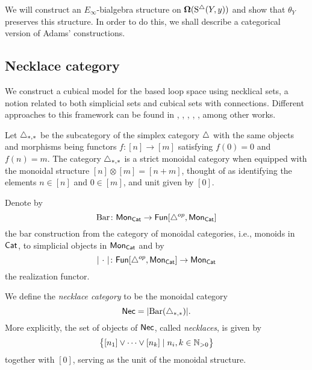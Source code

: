 We will construct an $E_{\infty}$-bialgebra structure on $\operatorname{\mathbf{\Omega}}(\operatorname{S^{\triangle}}(Y, y))$ and show that $\theta_Y$ preserves this structure.
In order to do this, we shall describe a categorical version of Adams' constructions.

\subsection{Necklace category}

We construct a cubical model for the based loop space using necklical sets, a notion related to both simplicial sets and cubical sets with connections.
Different approaches to this framework can be found in \cite{baues1998hopf}, \cite{galvez2020hopf}, \cite{dugger2011rigidification}, \cite{rivera2018cubical}, \cite{rivera2019path}, among other works.

Let $\triangle_{*,*}$ be the subcategory of the simplex category $\triangle$ with the same objects and morphisms being functors $f \colon [n] \to [m]$ satisfying $f(0) = 0$ and $f(n) = m$.
The category $\triangle_{*,*}$ is a strict monoidal category when equipped with the monoidal structure $[n] \otimes [m] = [n+m]$, thought of as identifying the elements $n \in [n]$ and $0 \in [m]$, and unit given by $[0]$.

Denote by
\begin{equation*}
\operatorname{Bar} \colon \mathsf{Mon}_{\mathsf{Cat}} \to \mathsf{Fun}[\triangle^{op}, \mathsf{Mon}_{\mathsf{Cat}}]
\end{equation*}
the bar construction from the category of monoidal categories, i.e., monoids in $\mathsf{Cat}$, to simplicial objects in $\mathsf{Mon}_{\mathsf{Cat}}$ and by
\begin{equation*}
\vert{\ \cdot \ }\vert \colon \mathsf{Fun}[\triangle^{op}, \mathsf{Mon}_{\mathsf{Cat}}] \to \mathsf{Mon}_{\mathsf{Cat}}
\end{equation*}
the realization functor.

We define the \textit{necklace category} to be the monoidal category
\begin{equation*}
\mathsf{Nec} = \vert{\operatorname{Bar}(\triangle_{*,*})}\vert.
\end{equation*}
More explicitly, the set of objects of $\mathsf{Nec}$, called \textit{necklaces}, is given by
\begin{equation*}
\big\{ [n_1] \vee \cdots \vee[n_k] \mid n_i, k \in \mathbb{N}_{>0} \big\}
\end{equation*}
together with $[0]$, serving as the unit of the monoidal structure.

